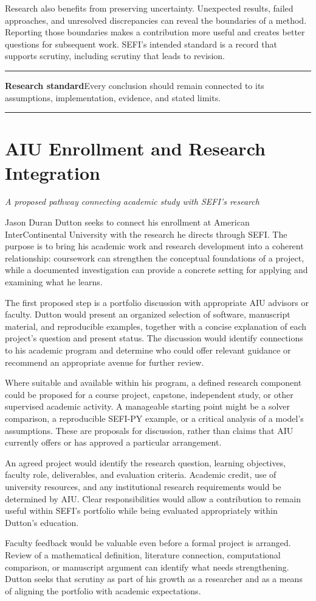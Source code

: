 \documentclass[10pt,letterpaper]{article}
\newcommand{\pageheading}[2]{\clearpage\section{#1}\textit{#2}\par\medskip}
\newcommand{\statement}[1]{\par\medskip\begingroup\color{Periwinkle}\hrule\smallskip\color{Ink}#1\par\smallskip\color{Periwinkle}\hrule\endgroup\medskip}
\begin{document}
Research also benefits from preserving uncertainty. Unexpected results, failed approaches, and unresolved discrepancies can reveal the boundaries of a method. Reporting those boundaries makes a contribution more useful and creates better questions for subsequent work. SEFI's intended standard is a record that supports scrutiny, including scrutiny that leads to revision.

\statement{\textbf{Research standard}\quad Every conclusion should remain connected to its assumptions, implementation, evidence, and stated limits.}

\pageheading{AIU Enrollment and Research Integration}{A proposed pathway connecting academic study with SEFI's research}
Jason Duran Dutton seeks to connect his enrollment at American InterContinental University with the research he directs through SEFI. The purpose is to bring his academic work and research development into a coherent relationship: coursework can strengthen the conceptual foundations of a project, while a documented investigation can provide a concrete setting for applying and examining what he learns.

The first proposed step is a portfolio discussion with appropriate AIU advisors or faculty. Dutton would present an organized selection of software, manuscript material, and reproducible examples, together with a concise explanation of each project's question and present status. The discussion would identify connections to his academic program and determine who could offer relevant guidance or recommend an appropriate avenue for further review.

Where suitable and available within his program, a defined research component could be proposed for a course project, capstone, independent study, or other supervised academic activity. A manageable starting point might be a solver comparison, a reproducible SEFI-PY example, or a critical analysis of a model's assumptions. These are proposals for discussion, rather than claims that AIU currently offers or has approved a particular arrangement.

An agreed project would identify the research question, learning objectives, faculty role, deliverables, and evaluation criteria. Academic credit, use of university resources, and any institutional research requirements would be determined by AIU. Clear responsibilities would allow a contribution to remain useful within SEFI's portfolio while being evaluated appropriately within Dutton's education.

Faculty feedback would be valuable even before a formal project is arranged. Review of a mathematical definition, literature connection, computational comparison, or manuscript argument can identify what needs strengthening. Dutton seeks that scrutiny as part of his growth as a researcher and as a means of aligning the portfolio with academic expectations.
\end{document}
